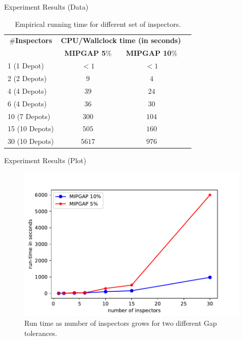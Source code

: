 \documentclass[handout]{beamer}
\begin{document}
  
\begin{frame}{Experiment Results (Data)}
\begin{table}[]
    \centering
    \begin{tabular}{|c|c|c|c|c|}
        \hline
        \multicolumn{2}{|c|}{\#\textbf{Inspectors}} & \multicolumn{2}{l|}{\textbf{CPU/Wallclock time (in seconds)}} \\ \cline{3-4} 
         \multicolumn{2}{|c|}{}  & \textbf{MIPGAP 5}\%           & \textbf{MIPGAP 10}\%           \\ \hline
        \multicolumn{2}{|l|}{1 (1 Depot)} & $< 1$                & $< 1$                   \\ \hline
        \multicolumn{2}{|l|}{2 (2 Depots)}  & $9$                 &  $4$           \\ \hline
        \multicolumn{2}{|l|}{4 (4 Depots)}  & $39$                 &  $24$           \\ \hline
        \multicolumn{2}{|l|}{6 (4 Depots)}  & $36$                 &  $30$           \\ \hline
        \multicolumn{2}{|l|}{10 (7 Depots)}  & $300$                 &  $104$           \\ \hline
        \multicolumn{2}{|l|}{15 (10 Depots)}  & $505$                 &  $160$           \\ \hline
        \multicolumn{2}{|l|}{30 (10 Depots)}  & $5617$                 &  $976$           \\ \hline
    \end{tabular}
    \caption{Empirical running time for different set of inspectors.}
    \label{tab:runtime-without-heuristic}
\end{table}
\end{frame}

\begin{frame}{Experiment Results (Plot)}
    \begin{figure}
        \centering
        \includegraphics[scale=0.6]{runtime.pdf}
        \caption{Run time as number of inspectors grows for two different Gap tolerances.}
        \label{fig:my_label}
    \end{figure}
\end{frame}
\end{document}
